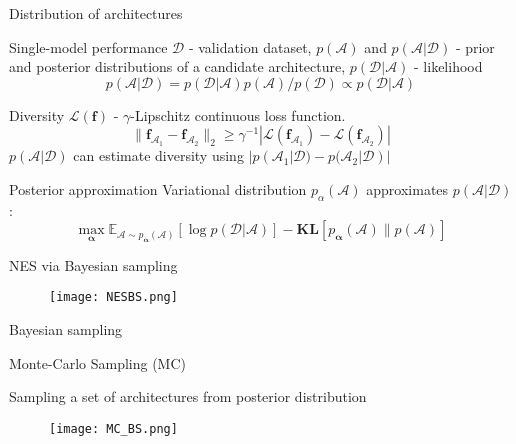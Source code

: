 \documentclass{beamer}
\def\*#1{\mathbf{#1}}
\begin{document}
\begin{frame}{Distribution of architectures}

\begin{block}{Single-model performance}
$\mathcal{D}$ - validation dataset, $p(\mathcal{A})$ and $p(\mathcal{A} | \mathcal{D})$ - prior and posterior distributions of a candidate architecture, $p(\mathcal{D} | \mathcal{A})$ - likelihood
\[p(\mathcal{A}| \mathcal{D}) = p(\mathcal{D} | \mathcal{A}) p(\mathcal{A}) / p(\mathcal{D}) \propto p(\mathcal{D} | \mathcal{A})\]

\end{block}

\begin{block}{Diversity}
    $\mathcal{L}(\*f)$ - $\gamma$-Lipschitz continuous loss function.
    \[\| \*f_{\mathcal{A}_1} -  \*f_{\mathcal{A}_2} \|_2 \ge \gamma^{-1} |\mathcal{L}(\*f_{\mathcal{A}_1} ) - \mathcal{L}(\*f_{\mathcal{A}_2})|\] $p(\mathcal{A}|\mathcal{D})$ can estimate diversity using $| p(\mathcal{A}_1|\mathcal{D}) - p(\mathcal{A}_2|\mathcal{D})|$
\end{block}

\begin{block}{Posterior approximation}
    Variational distribution $p_\alpha (\mathcal{A})$ approximates $p(\mathcal{A} | \mathcal{D})$:
    \begin{equation}
      \max\limits_{\*\alpha} \mathbb{E}_{\mathcal{A} \sim p_{\*\alpha}(\mathcal{A})} [\log p(\mathcal{D} | \mathcal{A})] - \*{KL}[p_{\*\alpha}(\mathcal{A}) \| p(\mathcal{A})]  
    \end{equation}

\end{block}

\end{frame}

\begin{frame}{NES via Bayesian sampling}

\begin{figure}
    \centering
    \texttt{[image: NESBS.png]}
    \label{fig:nesbs}
\end{figure}

\end{frame}

\begin{frame}{Bayesian sampling}

\begin{block}{Monte-Carlo Sampling (MC)}

Sampling a set of architectures from posterior distribution
    
\end{block}

\begin{figure}
    \centering
    \texttt{[image: MC\_BS.png]}
    \label{fig:mcbs}
\end{figure}

\end{frame}
\end{document}
